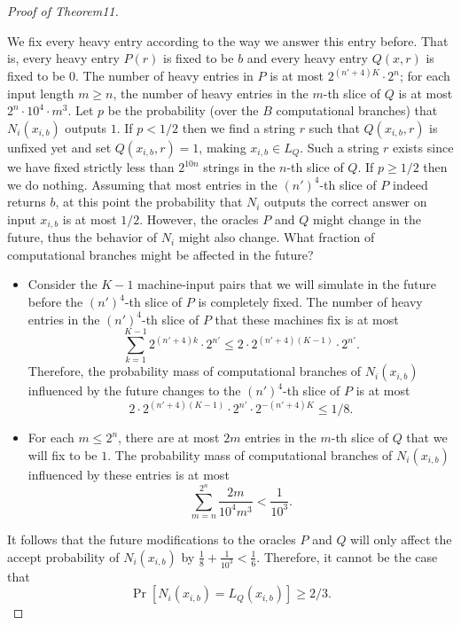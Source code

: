 \documentclass[10pt,a4paper]{article}
\begin{document}
\begin{proof}[Proof of Theorem11]
\begin{itemize}
\end{itemize}
We fix every heavy entry according to the way we answer this entry before. That is, every heavy entry $P(r)$ is fixed to be $b$ and every heavy entry $Q(x,r)$ is fixed to be $0$. The number of heavy entries in $P$ is at most $2^{(n'+4)K}\cdot2^n$; for each input length $m\geq n$, the number of heavy entries in the $m$-th slice of $Q$ is at most $2^n\cdot10^4\cdot m^3$.
Let $p$ be the probability (over the $B$ computational branches) that $N_i(x_{i,b})$ outputs $1$. If $p<1/2$ then we find a string $r$ such that $Q(x_{i,b},r)$ is unfixed yet and set $Q(x_{i,b},r)=1$, making $x_{i,b}\in L_Q$. Such a string $r$ exists since we have fixed strictly less than $2^{10n}$ strings in the $n$-th slice of $Q$. If $p\geq1/2$ then we do nothing.
Assuming that most entries in the $(n')^4$-th slice of $P$ indeed returns $b$, at this point the probability that $N_i$ outputs the correct answer on input $x_{i,b}$ is at most $1/2$. However, the oracles $P$ and $Q$ might change in the future, thus the behavior of $N_i$ might also change. What fraction of computational branches might be affected in the future?
\begin{itemize}
\item Consider the $K-1$ machine-input pairs that we will simulate in the future before the $(n')^4$-th slice of $P$ is completely fixed. The number of heavy entries in the $(n')^4$-th slice of $P$ that these machines fix is at most
\[\sum_{k=1}^{K-1}2^{(n'+4)k}\cdot2^{n'}\leq2\cdot2^{(n'+4)(K-1)}\cdot2^{n'}.\]
Therefore, the probability mass of computational branches of $N_i(x_{i,b})$ influenced by the future changes to the $(n')^4$-th slice of $P$ is at most
\[2\cdot2^{(n'+4)(K-1)}\cdot2^{n'}\cdot2^{-(n'+4)K}\leq1/8.\]
\item For each $m\leq2^n$, there are at most $2m$ entries in the $m$-th slice of $Q$ that we will fix to be $1$. The probability mass of computational branches of $N_i(x_{i,b})$ influenced by these entries is at most
\[\sum_{m=n}^{2^n}\frac{2m}{10^4m^3}<\frac{1}{10^3}.\]
\end{itemize}
It follows that the future modifications to the oracles $P$ and $Q$ will only affect the accept probability of $N_i(x_{i,b})$ by $\frac18+\frac{1}{10^3}<\frac16$. Therefore, it cannot be the case that
\[\Pr[N_i(x_{i,b})=L_Q(x_{i,b})]\geq2/3.\]

\end{proof}
\end{document}
